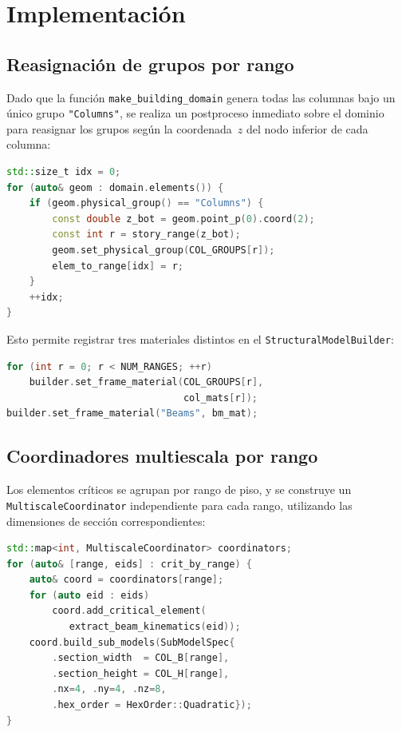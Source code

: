 \section{Implementación}
\label{sec:ms16-impl}

\subsection{Reasignación de grupos por rango}

Dado que la función \texttt{make\_building\_domain} genera todas las
columnas bajo un único grupo \texttt{"Columns"}, se realiza un
postproceso inmediato sobre el dominio para reasignar los grupos
según la coordenada~$z$ del nodo inferior de cada columna:

\begin{lstlisting}[language=C++,
  caption={Reasignación de grupos de columnas por rango de piso.}]
std::size_t idx = 0;
for (auto& geom : domain.elements()) {
    if (geom.physical_group() == "Columns") {
        const double z_bot = geom.point_p(0).coord(2);
        const int r = story_range(z_bot);
        geom.set_physical_group(COL_GROUPS[r]);
        elem_to_range[idx] = r;
    }
    ++idx;
}
\end{lstlisting}

Esto permite registrar tres materiales distintos en el
\texttt{StructuralModelBuilder}:

\begin{lstlisting}[language=C++,
  caption={Asignación de material por grupo de piso.}]
for (int r = 0; r < NUM_RANGES; ++r)
    builder.set_frame_material(COL_GROUPS[r],
                               col_mats[r]);
builder.set_frame_material("Beams", bm_mat);
\end{lstlisting}

\subsection{Coordinadores multiescala por rango}

Los elementos críticos se agrupan por rango de piso, y se construye
un \texttt{MultiscaleCoordinator} independiente para cada rango,
utilizando las dimensiones de sección correspondientes:

\begin{lstlisting}[language=C++,
  caption={Coordinadores por rango para submodelos con secciones distintas.}]
std::map<int, MultiscaleCoordinator> coordinators;
for (auto& [range, eids] : crit_by_range) {
    auto& coord = coordinators[range];
    for (auto eid : eids)
        coord.add_critical_element(
           extract_beam_kinematics(eid));
    coord.build_sub_models(SubModelSpec{
        .section_width  = COL_B[range],
        .section_height = COL_H[range],
        .nx=4, .ny=4, .nz=8,
        .hex_order = HexOrder::Quadratic});
}
\end{lstlisting}

